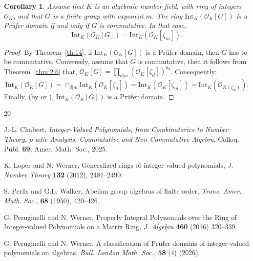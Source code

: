 \documentclass{amsart}
\newtheorem{corollary}[lemma]{Corollary}
\newtheorem{first argument}[lemma]{First Argument}
\theoremstyle{definition}
\theoremstyle{definitions}
\theoremstyle{remark}
\theoremstyle{remark}
\def\Oo{{\mathcal O}}           %
\def\int{\mathrm{Int}}         %
\begin{document}
\begin{corollary}
Assume that $K$ is an algebraic number field, with ring of integers $\Oo_K$, and that $G$ is a finite group with exponent $m$. 
The ring $\int_K(\Oo_K[G])$ is a Pr\"ufer domain if and only if $G$ is commutative. In that case,  $$\int_{K}(\Oo_K[G])=\int_{K}(\Oo_K[\zeta_m]).$$
\end{corollary}

\begin{proof}
By Theorem~\ref{th:14}, if $\int_K(\Oo_K[G])$ is a Pr\"ufer domain, then $G$ has to be commutative. Conversely, assume that $G$ is commutative, then it follows from Theorem~\ref{thm:2.6} that, $\Oo_K[G]=\prod_{d\vert m}(\Oo_K[\zeta_d])^{a_d}$. Consequently:
$$\int_{K}(\Oo_K[G])=\cap_{d\vert m}\int_{K}(\Oo_K[\zeta_d])=\int_{K}(\Oo_K[\zeta_m])=\int_K(\Oo_{K(\zeta_m)}).$$	
Finally, (by \cite[Theorem 3.7]{bib:LW2012} or \cite[Corollary VIII.60]{bib:C2}), $\int_K(\Oo_K[G])$ is a Pr\"ufer domain.
\end{proof}



\begin{thebibliography}{20}



J.-L. Chabert, {\em Integer-Valued Polynomials, from Combinatorics to Number Theory, $p$-adic Analysis, Commutative and Non-Commutative Algebra}, Colloq. Publ. {\bf 69}, Amer. Math. Soc., 2025.

K. Loper and N. Werner, Generalized rings of integer-valued polynomials, {\em J. Number Theory} {\bf 132} (2012), 2481--2490.

S. Perlis and G.L. Walker, Abelian group algebras of finite order, {\em Trans. Amer. Math. Soc.}, {\bf 68} (1950), 420--426.


G. Peruginelli and N. Werner, Properly Integral Polynomials over the Ring of Integer-valued Polynomials on a Matrix Ring, {\em J. Algebra} {\bf 460} (2016) 320--339.

G. Peruginelli and N. Werner, A classification of Pr\"ufer domains of integer-valued polynomials on algebras, {\em Bull. London Math. Soc.}, {\bf 58} (4) (2026).
\end{thebibliography}
\end{document}
